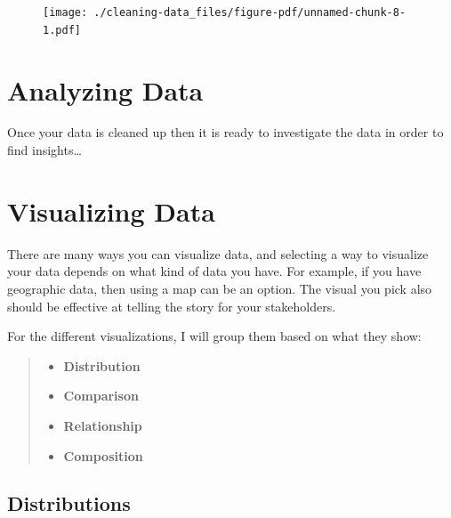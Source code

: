 \documentclass[
  letterpaper,
  DIV=11,
  numbers=noendperiod]{scrreprt}
\begin{document}
\begin{figure}[H]

{\centering \texttt{[image: ./cleaning-data\_files/figure-pdf/unnamed-chunk-8-1.pdf]}

}

\end{figure}


\hypertarget{analyzing-data}{%
\chapter{\texorpdfstring{\textbf{Analyzing
Data}}{Analyzing Data}}\label{analyzing-data}}

Once your data is cleaned up then it is ready to investigate the data in
order to find insights\ldots{}


\hypertarget{visualizing-data}{%
\chapter{\texorpdfstring{\textbf{Visualizing
Data}}{Visualizing Data}}\label{visualizing-data}}

There are many ways you can visualize data, and selecting a way to
visualize your data depends on what kind of data you have. For example,
if you have geographic data, then using a map can be an option. The
visual you pick also should be effective at telling the story for your
stakeholders.

For the different visualizations, I will group them based on what they
show:

\begin{quote}
\begin{itemize}
\item
  \textbf{Distribution}
\item
  \textbf{Comparison}
\item
  \textbf{Relationship}
\item
  \textbf{Composition}
\end{itemize}
\end{quote}

\hypertarget{distributions}{%
\section{\texorpdfstring{\textbf{Distributions}}{Distributions}}\label{distributions}}
\end{document}
